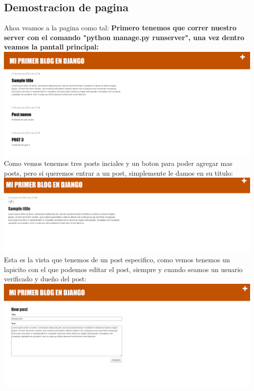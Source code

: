 \documentclass{article}
\begin{document}
        \subsection{Demostracion de pagina}
        Ahoa veamos a la pagina como tal:\newline\newline
        \textbf{Primero tenemos que correr nuestro server con el comando "python manage.py runserver", una vez dentro veamos la pantall principal:} \newline \newline \newline \newline 
        \includegraphics[width=16cm]{img/paginaInicial.png}
        Como vemos tenemos tres posts inciales y un boton para poder agregar mas posts, pero si queremos entrar a un post, simplemente le damos en su titulo:
        \newline\newline
        \includegraphics[width=16cm]{img/detallePost.png}
        Esta es la vista que tenemos de un post especifico, como vemos tenemos un lapicito con el que podemos editar el post, siempre y cuando seamos un usuario verificado y dueño del post:
        \newline\newline
        \includegraphics[width=16cm]{img/edicionPosts.png}
\end{document}
